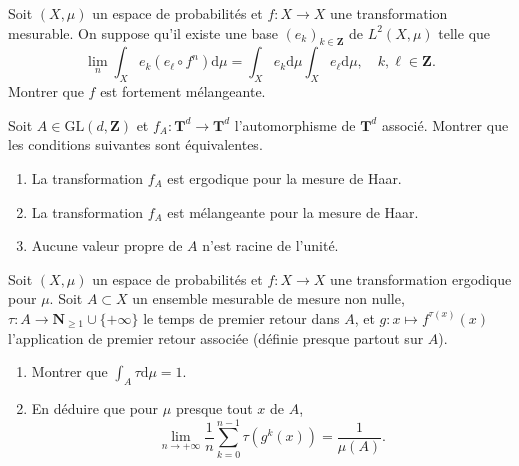 \documentclass[a4paper,10pt,openany]{article}
\theoremstyle{plain}
\theoremstyle{definition}
\newcommand{\dd}{\mathrm{d}}
\newcommand{\T}{\mathbf{T}}
\newcommand{\Z}{\mathbf{Z}}
\newcommand{\N}{\mathbf{N}}
\begin{document}
\vspace{0.6cm}

 \vspace{1.5mm}

\noindent Soit $(X, \mu)$ un espace de probabilit\'es et $f : X \to X$ une transformation mesurable. On suppose qu'il existe une base $(e_k)_{k \in \Z}$ de $L^2(X,\mu)$ telle que
$$
\lim_n \int_X e_k \left(e_\ell \circ f^n\right) \dd \mu = \int_X e_k\dd \mu \int_X e_\ell \dd \mu, \quad k, \ell \in \Z.
$$
Montrer que $f$ est fortement m\'elangeante.
\vspace{0.6cm}

 \vspace{1.5mm} 

\noindent Soit $A \in \mathrm{GL}(d,\Z)$ et $f_A : \T^d \to \T^d$ l'automorphisme de $\T^d$ associ\'e. Montrer que les conditions suivantes sont \'equivalentes.
\begin{enumerate}[label = \textit{(\roman*)}]
\item La transformation $f_A$ est ergodique pour la mesure de Haar.
\item La transformation $f_A$ est m\'elangeante pour la mesure de Haar.
\item Aucune valeur propre de $A$ n'est racine de l'unit\'e.
\end{enumerate}

\vspace{0.6cm}

 \vspace{1.5mm} 

\noindent Soit $(X, \mu)$ un espace de probabilit\'es et $f : X \to X$ une transformation ergodique pour $\mu$. Soit $A \subset X$ un ensemble mesurable de mesure non nulle, $\tau : A \to \N_{\geq 1} \cup \{+\infty\}$ le temps de premier retour dans $A$, et $g : x \mapsto f^{\tau(x)}(x)$ l'application de premier retour associ\'ee (d\'efinie presque partout sur $A$). 
\begin{enumerate}
\item Montrer que $\displaystyle{\int_A \tau \dd \mu = 1}.$
\item En d\'eduire que pour $\mu$ presque tout $x$ de $A$,
$$
\lim_{n \to + \infty}\frac{1}{n} \sum_{k=0}^{n-1} \tau\left(g^k(x)\right) = \frac{1}{\mu(A)}.
$$
\end{enumerate}
\end{document}
